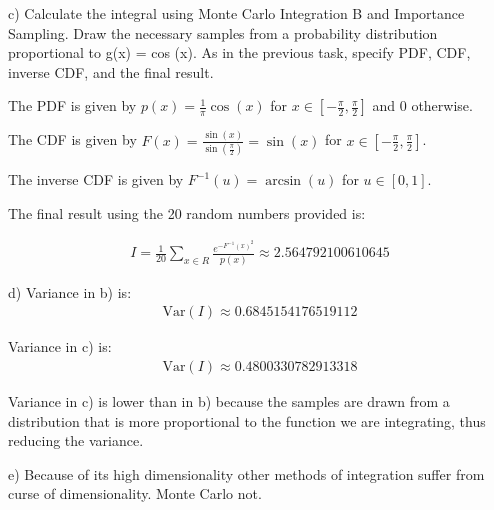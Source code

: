 \documentclass{article}
\begin{document}
    c) Calculate the integral using Monte Carlo Integration B and Importance Sampling. Draw the necessary samples from a probability distribution proportional to g(x) = cos (x). As in the previous task, specify PDF, CDF, inverse CDF, and the final result.

    The PDF is given by $p(x) = \frac{1}{\pi} \cos(x)$ for $x \in [-\frac{\pi}{2}, \frac{\pi}{2}]$ and 0 otherwise.

    The CDF is given by $F(x) = \frac{\sin(x)}{\sin(\frac{\pi}{2})} = \sin(x)$ for $x \in [-\frac{\pi}{2}, \frac{\pi}{2}]$.

    The inverse CDF is given by $F^{-1}(u) = \arcsin(u)$ for $u \in [0, 1]$.

    The final result using the 20 random numbers provided is:

    \begin{align*}
        I = \frac{1}{20} \sum_{x \in R} \frac{e^{-F^{-1}(x)^2}}{p(x)} \approx 2.564792100610645
    \end{align*}

    d) 
    Variance in b) is:
    \begin{align*}
        \text{Var}(I) \approx 0.6845154176519112
    \end{align*}

    Variance in c) is:
    \begin{align*}
        \text{Var}(I) \approx 0.4800330782913318
    \end{align*}

    Variance in c) is lower than in b) because the samples are drawn from a distribution that is more proportional to the function we are integrating, thus reducing the variance.

    e) Because of its high dimensionality other methods of integration suffer from curse of dimensionality. Monte Carlo not.
\end{document}
